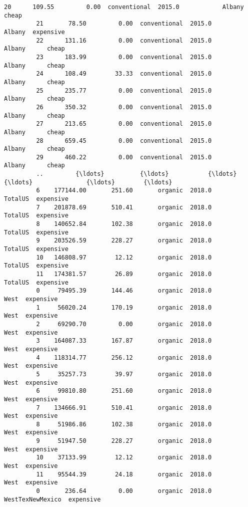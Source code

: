 \documentclass[11pt]{article}
\begin{document}
\begin{Verbatim}[commandchars=\\\{\}]
         20      109.55         0.00  conventional  2015.0            Albany      cheap
         21       78.50         0.00  conventional  2015.0            Albany  expensive
         22      131.16         0.00  conventional  2015.0            Albany      cheap
         23      183.99         0.00  conventional  2015.0            Albany      cheap
         24      108.49        33.33  conventional  2015.0            Albany      cheap
         25      235.77         0.00  conventional  2015.0            Albany      cheap
         26      350.32         0.00  conventional  2015.0            Albany      cheap
         27      213.65         0.00  conventional  2015.0            Albany      cheap
         28      659.45         0.00  conventional  2015.0            Albany      cheap
         29      460.22         0.00  conventional  2015.0            Albany      cheap
         ..         {\ldots}          {\ldots}           {\ldots}     {\ldots}               {\ldots}        {\ldots}
         6    177144.00       251.60       organic  2018.0           TotalUS  expensive
         7    201878.69       510.41       organic  2018.0           TotalUS  expensive
         8    140652.84       102.38       organic  2018.0           TotalUS  expensive
         9    203526.59       228.27       organic  2018.0           TotalUS  expensive
         10   146808.97        12.12       organic  2018.0           TotalUS  expensive
         11   174381.57        26.89       organic  2018.0           TotalUS  expensive
         0     79495.39       144.46       organic  2018.0              West  expensive
         1     56020.24       170.19       organic  2018.0              West  expensive
         2     69290.70         0.00       organic  2018.0              West  expensive
         3    164087.33       167.87       organic  2018.0              West  expensive
         4    118314.77       256.12       organic  2018.0              West  expensive
         5     35257.73        39.97       organic  2018.0              West  expensive
         6     99810.80       251.60       organic  2018.0              West  expensive
         7    134666.91       510.41       organic  2018.0              West  expensive
         8     51986.86       102.38       organic  2018.0              West  expensive
         9     51947.50       228.27       organic  2018.0              West  expensive
         10    37133.99        12.12       organic  2018.0              West  expensive
         11    95544.39        24.18       organic  2018.0              West  expensive
         0       236.64         0.00       organic  2018.0  WestTexNewMexico  expensive

\end{Verbatim}
\end{document}
